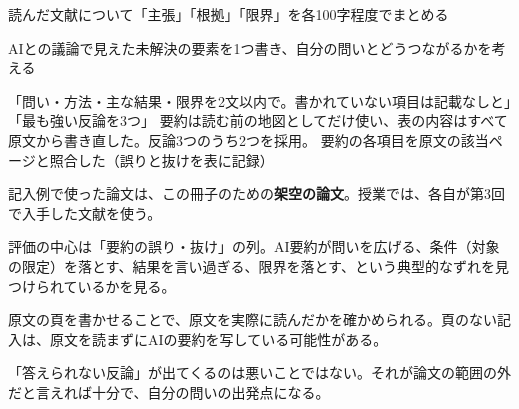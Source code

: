 \begin{nexttime}
  \item 読んだ文献について「主張」「根拠」「限界」を各100字程度でまとめる
  \item AIとの議論で見えた未解決の要素を1つ書き、自分の問いとどうつながるかを考える
\end{nexttime}
{「問い・方法・主な結果・限界を2文以内で。書かれていない項目は記載なしと」「最も強い反論を3つ」}
{要約は読む前の地図としてだけ使い、表の内容はすべて原文から書き直した。反論3つのうち2つを採用。}
{要約の各項目を原文の該当ページと照合した（誤りと抜けを表に記録）}

\begin{point}
  \item 記入例で使った論文は、この冊子のための\textbf{架空の論文}。授業では、各自が第3回で入手した文献を使う。
  \item 評価の中心は「要約の誤り・抜け」の列。AI要約が問いを広げる、条件（対象の限定）を落とす、結果を言い過ぎる、限界を落とす、という典型的なずれを見つけられているかを見る。
  \item 原文の頁を書かせることで、原文を実際に読んだかを確かめられる。頁のない記入は、原文を読まずにAIの要約を写している可能性がある。
  \item 「答えられない反論」が出てくるのは悪いことではない。それが論文の範囲の外だと言えれば十分で、自分の問いの出発点になる。
\end{point}

